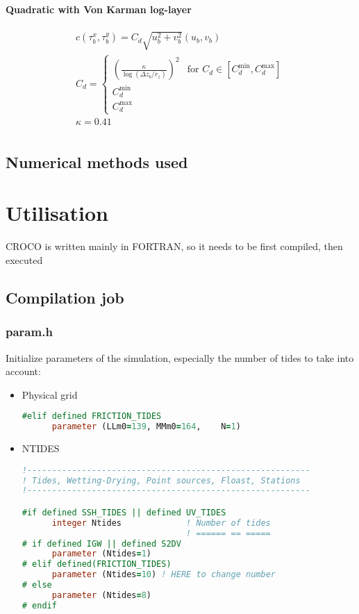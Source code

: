\message{ !name(croco.tex)}\documentclass{article}
\begin{document}
\paragraph{Quadratic with Von Karman log-layer}
\begin{align}c
  \label{eq:quadratic_friction_vonkarman}
  (\tau_b^x, \tau_b^y) = C_d \sqrt{u_b^2 + v_b^2}(u_b, v_b) \\  
  C_d = \left\{\begin{array}{ll}
                 {\left(\frac{\kappa}{\log({\Delta z_b}/{r_z})}\right)}^2 & \text{for } C_d \in [C_d^{\min}, C_d^{\max}] \\
                 C_d^{\min} & \\
                 C_d^{\max}
       \end{array}
  \right. \\
  \kappa=0.41 \\  
\end{align}

\subsection{Numerical methods used}
\section{Utilisation}
CROCO is written mainly in FORTRAN, so it needs to be first compiled, then executed
\subsection{Compilation job}
\subsubsection{param.h}
Initialize parameters of the simulation, especially the number of tides to take into account:
\begin{itemize}
\item Physical grid
  \begin{lstlisting}[language=Fortran]
    #elif defined FRICTION_TIDES
      parameter (LLm0=139, MMm0=164,    N=1) 
    \end{lstlisting}
  \item NTIDES
    \begin{lstlisting}[language=Fortran]
!---------------------------------------------------------
! Tides, Wetting-Drying, Point sources, Floast, Stations
!---------------------------------------------------------

#if defined SSH_TIDES || defined UV_TIDES
      integer Ntides             ! Number of tides
                                 ! ====== == =====
# if defined IGW || defined S2DV
      parameter (Ntides=1)
# elif defined(FRICTION_TIDES)
      parameter (Ntides=10) ! HERE to change number
# else
      parameter (Ntides=8)
# endif
\end{lstlisting}

\end{itemize}
\end{document}
